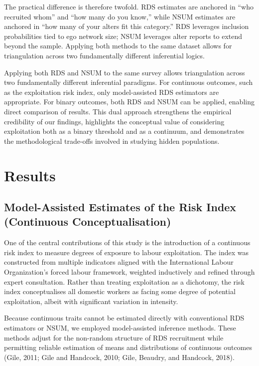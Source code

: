\documentclass[
  12pt,
  letterpaper,
  DIV=11,
  numbers=noendperiod]{scrartcl}
\theoremstyle{plain}
\theoremstyle{definition}
\begin{document}
The practical difference is therefore twofold. RDS estimates are
anchored in ``who recruited whom'' and ``how many do you know,'' while
NSUM estimates are anchored in ``how many of your alters fit this
category.'' RDS leverages inclusion probabilities tied to ego network
size; NSUM leverages alter reports to extend beyond the sample. Applying
both methods to the same dataset allows for triangulation across two
fundamentally different inferential logics.

Applying both RDS and NSUM to the same survey allows triangulation
across two fundamentally different inferential paradigms. For continuous
outcomes, such as the exploitation risk index, only model-assisted RDS
estimators are appropriate. For binary outcomes, both RDS and NSUM can
be applied, enabling direct comparison of results. This dual approach
strengthens the empirical credibility of our findings, highlights the
conceptual value of considering exploitation both as a binary threshold
and as a continuum, and demonstrates the methodological trade-offs
involved in studying hidden populations.

\section{Results}\label{results}

\subsection{Model-Assisted Estimates of the Risk Index (Continuous
Conceptualisation)}\label{model-assisted-estimates-of-the-risk-index-continuous-conceptualisation}

One of the central contributions of this study is the introduction of a
continuous risk index to measure degrees of exposure to labour
exploitation. The index was constructed from multiple indicators aligned
with the International Labour Organization's forced labour framework,
weighted inductively and refined through expert consultation. Rather
than treating exploitation as a dichotomy, the risk index conceptualises
all domestic workers as facing some degree of potential exploitation,
albeit with significant variation in intensity.

Because continuous traits cannot be estimated directly with conventional
RDS estimators or NSUM, we employed model-assisted inference methods.
These methods adjust for the non-random structure of RDS recruitment
while permitting reliable estimation of means and distributions of
continuous outcomes (Gile, 2011; Gile and Handcock, 2010; Gile, Beaudry,
and Handcock, 2018).
\end{document}

